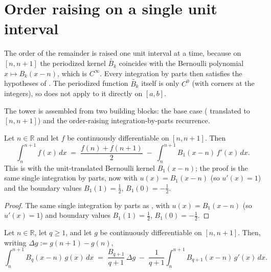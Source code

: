 \section{Order raising on a single unit interval}
\label{sec:em_tower}

The order of the remainder is raised one unit interval at a time, because on $[n,n+1]$
the periodized kernel $\widetilde{B_k}$ coincides with the Bernoulli polynomial
$x \mapsto B_k(x-n)$, which is $C^\infty$. Every integration by parts then satisfies the
hypotheses of . The periodized function $\widetilde{B_k}$ itself is only
$C^0$ (with corners at the integers), so  does not apply to it directly on
$[a,b]$.

The tower is assembled from two building blocks: the base case
( translated to $[n,n+1]$) and the order-raising
integration-by-parts recurrence.

\begin{lemma}
\label{lem:em_step_translate}
\leanok
{}
Let $n \in \mathbb{R}$ and let $f$ be continuously differentiable on $[n,n+1]$. Then
\[
  \int_n^{n+1} f(x)\,dx
    \;=\; \frac{f(n)+f(n+1)}{2} \;-\; \int_n^{n+1} B_1(x-n)\,f'(x)\,dx .
\]
This is  with the unit-translated Bernoulli kernel $B_1(x-n)$;
the proof is the same single integration by parts, now with $u(x)=B_1(x-n)$
(so $u'(x)=1$) and the boundary values $B_1(1)=\tfrac12$, $B_1(0)=-\tfrac12$.
\end{lemma}

\begin{proof}
\leanok
{}
The same single integration by parts as , with $u(x)=B_1(x-n)$
(so $u'(x)=1$) and boundary values $B_1(1)=\tfrac12$, $B_1(0)=-\tfrac12$.
\end{proof}

\begin{lemma}
\label{lem:em_recurrence}
\leanok
{}
Let $n \in \mathbb{R}$, let $q \ge 1$, and let $g$ be continuously differentiable on
$[n,n+1]$. Then, writing $\Delta g := g(n+1)-g(n)$,
\[
  \int_n^{n+1} B_q(x-n)\,g(x)\,dx
    \;=\; \frac{B_{q+1}}{q+1}\,\Delta g
        \;-\; \frac{1}{q+1}\int_n^{n+1} B_{q+1}(x-n)\,g'(x)\,dx .
\]
\end{lemma}

